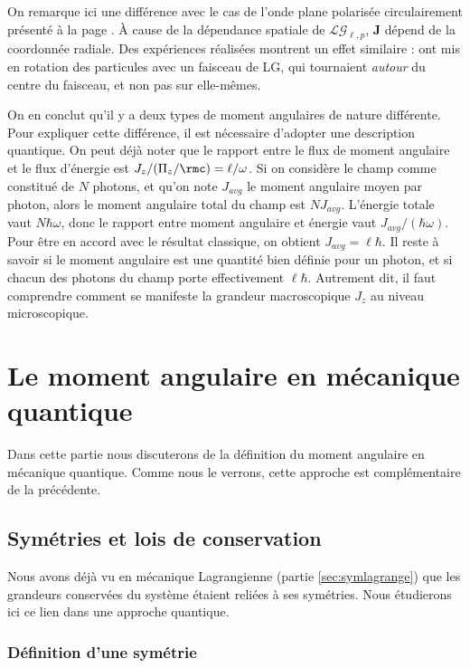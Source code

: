 On remarque ici une différence avec le cas de l'onde plane polarisée circulairement présenté à la page \pageref{sec:ma_circ}. \`{A} cause de la dépendance spatiale de $\mathcal{LG}_{\ell,p}$, $\bm{J}$ dépend de la coordonnée radiale. Des expériences réalisées montrent un effet similaire :  ont mis en rotation des particules avec un faisceau de LG, qui tournaient \textit{autour} du centre du faisceau, et non pas sur elle-mêmes. 

On en conclut qu'il y a deux types de moment angulaires de nature différente. Pour expliquer cette différence, il est nécessaire d'adopter une description quantique. 
On peut déjà noter que le rapport entre le flux de moment angulaire et le flux d'énergie est $J_z/(\Pi_z/\rmc) = \ell/\omega$. Si on considère le champ comme constitué de $N$ photons, et qu'on note $J_{avg}$ le moment angulaire moyen par photon, alors le moment angulaire total du champ est $NJ_{avg}$. L'énergie totale vaut $N\hbar\omega$, donc le rapport entre moment angulaire et énergie vaut $J_{avg}/(\hbar\omega)$. Pour être en accord avec le résultat classique, on obtient $J_{avg} = \ell\hbar$. Il reste à savoir si le moment angulaire est une quantité bien définie pour un photon, et si chacun des photons du champ porte effectivement $\ell\hbar$. Autrement dit, il faut comprendre comment se manifeste la grandeur macroscopique $J_z$ au niveau microscopique. 



\chapter{Le moment angulaire en mécanique quantique}
Dans cette partie nous discuterons de la définition du moment angulaire en mécanique quantique. Comme nous le verrons, cette approche est complémentaire de la précédente.

\section{Symétries et lois de conservation}
\label{symqm}
Nous avons déjà vu en mécanique Lagrangienne (partie \ref{sec:symlagrange}) que les grandeurs conservées du système étaient reliées à ses symétries. Nous étudierons ici ce lien dans une approche quantique.

\subsection{Définition d'une symétrie}
